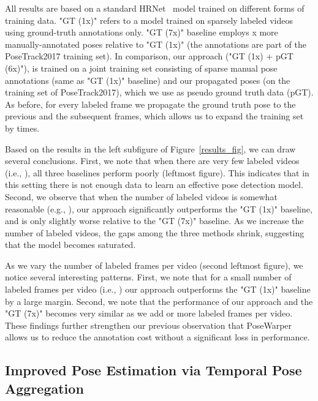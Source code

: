 \documentclass{article}
\begin{document}
All results are based on a standard HRNet~\cite{sun2019deep} model trained on different forms of training data. "GT (1x)" refers to a model trained on sparsely labeled videos using ground-truth annotations only. "GT (7x)" baseline employs x more manually-annotated poses relative to "GT (1x)" (the annotations are part of the PoseTrack2017 training set). In comparison, our approach ("GT (1x) + pGT (6x)"), is trained on a joint training set consisting of sparse manual pose annotations (same as  "GT (1x)" baseline) and our propagated poses (on the training set of PoseTrack2017), which we use as pseudo ground truth data (pGT). As before, for every labeled frame we propagate the ground truth pose to the  previous and the  subsequent frames, which allows us to expand the training set by  times. 
 








Based on the results in the left subfigure of Figure~\ref{results_fig}, we can draw several conclusions. First, we note that when there are very few labeled videos (i.e., ), all three baselines perform poorly (leftmost figure). This indicates that in this setting there is not enough data to learn an effective pose detection model. Second, we observe that when the number of labeled videos is somewhat reasonable (e.g., ), our approach significantly outperforms the "GT (1x)" baseline, and is only slightly worse relative to the "GT (7x)" baseline. As we increase the number of labeled videos, the gaps among the three methods shrink, suggesting that the model becomes saturated.



As we vary the number of labeled frames per video (second leftmost figure), we notice several interesting patterns. First, we note that for a small number of labeled frames per video (i.e., ) our approach outperforms the "GT (1x)" baseline by a large margin. Second, we note that the performance of our approach and the "GT (7x)" becomes very similar as we add  or more labeled frames per video. These findings further strengthen our previous observation that PoseWarper allows us to reduce the annotation cost without a significant loss in performance.







\subsection{Improved Pose Estimation via Temporal Pose Aggregation}
\end{document}
